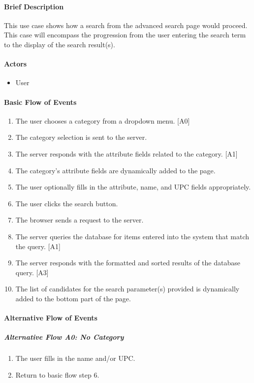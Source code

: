 \documentclass{article}
\begin{document}
\paragraph{Brief Description}
This use case shows how a search from the advanced search page  would proceed. This case will encompass the progression from the user entering the search term to the display of the search result(s).

\paragraph{Actors}
\begin{itemize}
\item User
\end{itemize}

\paragraph{Basic Flow of Events}
\begin{enumerate}
\item The user chooses a category from a dropdown menu. [A0]
\item The category selection is sent to the server.
\item The server responds with the attribute fields related to the category. [A1]
\item The category's attribute fields are dynamically added to the page.
\item The user optionally fills in the attribute, name, and UPC fields appropriately.
\item The user clicks the search button.
\item The browser sends a request to the server.
\item The server queries the database for items entered into the system that match the query. [A1]
\item The server responds with the formatted and sorted results of the database query. [A3]
\item The list of candidates for the search parameter(s) provided is dynamically added to the bottom part of the page.
\end{enumerate}

\paragraph{Alternative Flow of Events}

\subparagraph{Alternative Flow A0: No Category}
\begin{enumerate}
\item The user fills in the name and/or UPC.
\item Return to basic flow step 6.
\end{enumerate}
\end{document}
